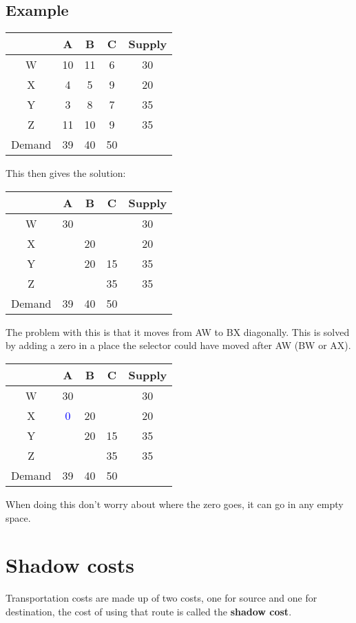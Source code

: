 \documentclass{article}[18pt]
\newcommand{\cred}[1]{\color{red}#1}
\begin{document}
\subsection{Example}
\begin{center}
\begin{tabular}{ |c|c|c|c|c| }
\hline
&A&B&C&Supply\\
\hline
W&10&11&6&30\\
\hline
X&4&5&9&20\\
\hline
Y&3&8&7&35\\
\hline
Z&11&10&9&35\\
\hline
Demand&39&40&50&\\
\hline
\end{tabular}
\end{center}
This then gives the solution:
\begin{center}
\begin{tabular}{ |c|c|c|c|c| }
\hline
&A&B&C&Supply\\
\hline
W&\cred{30}&&&30\\
\hline
X&&\cred{20}&&20\\
\hline
Y&&\cred{20}&\cred{15}&35\\
\hline
Z&&&\cred{35}&35\\
\hline
Demand&39&40&50&\\
\hline
\end{tabular}
\end{center}
The problem with this is that it moves from AW to BX diagonally. This is solved by adding a zero in a place the selector could have moved after AW (BW or AX).
\begin{center}
\begin{tabular}{ |c|c|c|c|c| }
\hline
&A&B&C&Supply\\
\hline
W&\cred{30}&&&30\\
\hline
X&\textcolor{blue}{0}&\cred{20}&&20\\
\hline
Y&&\cred{20}&\cred{15}&35\\
\hline
Z&&&\cred{35}&35\\
\hline
Demand&39&40&50&\\
\hline
\end{tabular}
\end{center}
When doing this don't worry about where the zero goes, it can go in any empty space.
\section{Shadow costs}
Transportation costs are made up of two costs, one for source and one for destination, the cost of using that route is called the \textbf{shadow cost}.\\
\end{document}
